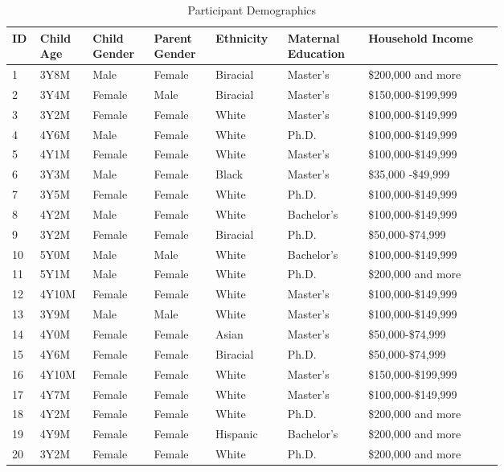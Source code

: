 \begin{table}[t!]
    \caption{Participant Demographics}
    \label{tab:demographics}
    \centering
\fontsize{6.3}{8.3}\selectfont
    \begin{tabular}{p{0.02\linewidth}p{0.06\linewidth}p{0.09\linewidth}p{0.09\linewidth}p{0.09\linewidth}p{0.13\linewidth}p{0.23\linewidth}}%
        \toprule
         \textbf{ID} & \textbf{Child Age} & \textbf{Child Gender} & \textbf{Parent Gender} & \textbf{Ethnicity} & \textbf{Maternal Education} & \textbf{Household Income} \\
        \midrule
         1 & 3Y8M & Male & Female & Biracial & Master's & \$200,000 and more \\
         \midrule
         2 & 3Y4M & Female & Male & Biracial & Master's & \$150,000-\$199,999\\
         \midrule
         3 & 3Y2M & Female & Female & White & Master's & \$100,000-\$149,999\\
         \midrule
         4 & 4Y6M & Male & Female & White & Ph.D. & \$100,000-\$149,999\\
         \midrule
         5 & 4Y1M & Female & Female & White & Master's & \$100,000-\$149,999\\
         \midrule
         6 & 3Y3M & Male & Female & Black & Master's & \$35,000 -\$49,999\\
         \midrule
         7 & 3Y5M & Female & Female & White & Ph.D. & \$100,000-\$149,999\\
         \midrule
         8 & 4Y2M & Male & Female & White & Bachelor's & \$100,000-\$149,999\\
         \midrule
         9 & 3Y2M & Female & Female & Biracial & Ph.D. & \$50,000-\$74,999\\
         \midrule
         10 & 5Y0M & Male & Male & White & Bachelor's & \$100,000-\$149,999\\
         \midrule
         11 & 5Y1M & Male & Female & White & Ph.D. & \$200,000 and more\\
         \midrule
         12 & 4Y10M & Female & Female & White & Master's & \$100,000-\$149,999\\
         \midrule
         13 & 3Y9M & Male & Male & White & Master's & \$100,000-\$149,999\\
         \midrule
         14 & 4Y0M & Female & Female & Asian & Master's & \$50,000-\$74,999\\
         \midrule
         15 & 4Y6M & Female & Female & Biracial & Ph.D. & \$50,000-\$74,999\\
         \midrule
         16 & 4Y10M & Female & Female & White & Master's & \$150,000-\$199,999\\
         \midrule
         17 & 4Y7M & Female & Female & White & Master's & \$100,000-\$149,999\\
         \midrule
         18 & 4Y2M & Female & Female & White & Ph.D. & \$200,000 and more\\
         \midrule
         19 & 4Y9M & Female & Female & Hispanic & Bachelor's & \$200,000 and more\\
         \midrule
         20 & 3Y2M & Female & Female & White & Ph.D. & \$200,000 and more\\
         

\end{tabular}
\end{table}
